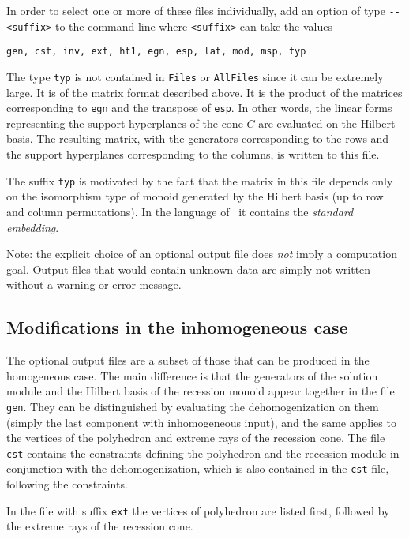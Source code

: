 \documentclass[12pt,a4paper]{scrartcl}
\theoremstyle{definition}
\def\ttt{\texttt}
\begin{document}
In order to select one or more of these files individually, add an option of type \verb|--<suffix>| to the command line where \verb|<suffix>| can take the values
\begin{Verbatim}
gen, cst, inv, ext, ht1, egn, esp, lat, mod, msp, typ
\end{Verbatim}

The type \verb|typ| is not contained in \verb|Files| or \verb|AllFiles| since it can be extremely large. It is of the matrix format described above. It is the product of the matrices
corresponding to \ttt{egn} and the transpose of \ttt{esp}. In other
words, the linear forms representing the support
hyperplanes of the cone $C$ are evaluated on the
Hilbert basis. The resulting matrix, with the
generators corresponding to the rows and the support
hyperplanes corresponding to the columns, is written to
this file.

The suffix \ttt{typ} is motivated by the fact that the
matrix in this file depends only on the isomorphism
type of monoid generated by the Hilbert basis (up to
row and column permutations). In the language of~\cite{BG}
it contains the \emph{standard embedding}.

Note: the explicit choice of an optional output file does \emph{not} imply a computation goal. Output files that would contain unknown data are simply not written without a warning or error message.

\subsection{Modifications in the inhomogeneous case}

The optional output files are a subset of those that can be produced in the homogeneous
case. The main difference is that the generators of the solution module and the
Hilbert basis of the recession monoid appear together in the file \verb|gen|.
They can be distinguished by evaluating the dehomogenization on them (simply the last component with inhomogeneous input), and the
same applies to the vertices of the polyhedron and extreme rays of the
recession cone. The file \verb|cst| contains the constraints defining the
polyhedron and the recession module in conjunction with the dehomogenization, which is also contained in the \verb|cst| file, following the constraints.

In the file with suffix \verb|ext| the vertices of polyhedron are listed first, followed by the extreme rays of the recession cone.
\end{document}
